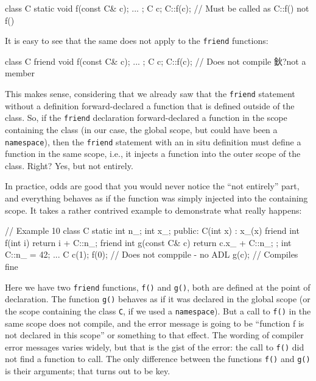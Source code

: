 \begin{code}
class C {
  static void f(const C& c);
  ...
};
C c;
C::f(c);    // Must be called as C::f() not f()
\end{code}

It is easy to see that the same does not apply to the \texttt{friend} functions:

\begin{code}
class C {
  friend void f(const C& c);
  ...
};
C c;
C::f(c);    // Does not compile 鈥?not a member
\end{code}

This makes sense, considering that we already saw that the \texttt{friend} statement without a definition forward-declared a function that is defined outside of the class. So, if the \texttt{friend} declaration forward-declared a function in the scope containing the class (in our case, the global scope, but could have been a \texttt{namespace}), then the \texttt{friend} statement with an in situ definition must define a function in the same scope, i.e., it injects a function into the outer scope of the class. Right? Yes, but not entirely.

In practice, odds are good that you would never notice the ``not entirely'' part, and everything behaves as if the function was simply injected into the containing scope. It takes a rather contrived example to demonstrate what really happens:

\begin{code}
// Example 10
class C {
  static int n_;
  int x_;
  public:
  C(int x) : x_(x) {}
  friend int f(int i) { return i + C::n_; }
  friend int g(const C& c) { return c.x_ + C::n_; }
};
int C::n_ = 42;
...
C c(1);
f(0);        // Does not comppile - no ADL
g(c);        // Compiles fine
\end{code}

Here we have two \texttt{friend} functions, \texttt{f()} and \texttt{g()}, both are defined at the point of declaration. The function \texttt{g()} behaves as if it was declared in the global scope (or the scope containing the class \texttt{C}, if we used a \texttt{namespace}). But a call to \texttt{f()} in the same scope does not compile, and the error message is going to be ``function f is not declared in this scope'' or something to that effect. The wording of compiler error messages varies widely, but that is the gist of the error: the call to \texttt{f()} did not find a function to call. The only difference between the functions \texttt{f()} and \texttt{g()} is their arguments; that turns out to be key.

